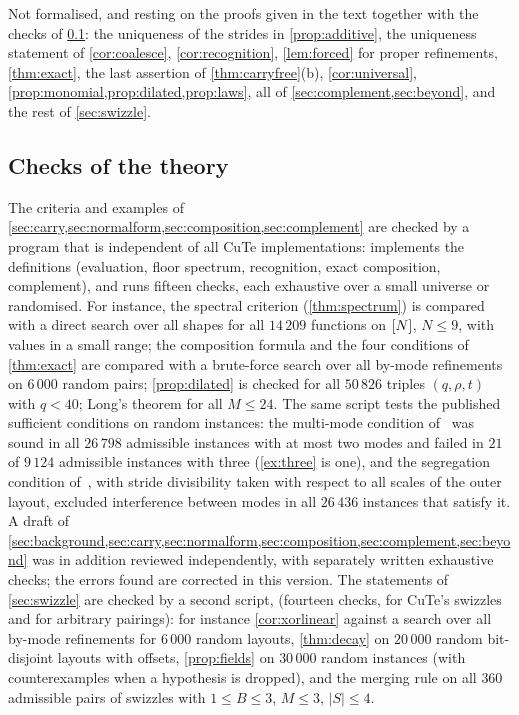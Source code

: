 Not formalised, and resting on the proofs given in the text together with the checks of
\cref{sec:checks}: the uniqueness of the strides in \cref{prop:additive}, the uniqueness statement
of \cref{cor:coalesce},
\cref{cor:recognition}, \cref{lem:forced} for proper refinements, \cref{thm:exact}, the last
assertion of \cref{thm:carryfree}(b), \cref{cor:universal},
\cref{prop:monomial,prop:dilated,prop:laws}, all of \cref{sec:complement,sec:beyond}, and the
rest of \cref{sec:swizzle}.

\subsection{Checks of the theory}\label{sec:checks}

The criteria and examples of \cref{sec:carry,sec:normalform,sec:composition,sec:complement} are
checked by a program that is independent of all CuTe implementations:  implements
the definitions (evaluation, floor spectrum, recognition, exact composition, complement), and
 runs fifteen checks, each exhaustive over a small universe or
randomised. For instance, the spectral criterion (\cref{thm:spectrum}) is compared with a direct
search over all shapes for all $14\,209$ functions on $[N]$, $N\le9$, with values in a small
range; the composition formula and the four conditions of \cref{thm:exact} are compared with a
brute-force search over all by-mode refinements on $6\,000$ random pairs; \cref{prop:dilated} is
checked for all $50\,826$ triples $(q,\rho,t)$ with $q<40$; Long's theorem for all $M\le24$.
The same script tests the published sufficient conditions on random instances: the multi-mode
condition of~\cite{shah2024} was sound in all $26\,798$ admissible instances with at most two
modes and failed in $21$ of $9\,124$ admissible instances with three (\cref{ex:three} is one), and
the segregation condition of~\cite{cecka2026}, with stride divisibility taken with respect to
all scales of the outer layout, excluded interference between modes in all $26\,436$ instances
that satisfy it.
A draft of \cref{sec:background,sec:carry,sec:normalform,sec:composition,sec:complement,sec:beyond}
was in addition reviewed independently, with separately written exhaustive checks; the errors
found are corrected in this version.
The statements of \cref{sec:swizzle} are checked by a second script, 
(fourteen checks, for CuTe's swizzles and for arbitrary pairings): for instance \cref{cor:xorlinear} against a search over all by-mode refinements
for $6\,000$ random layouts, \cref{thm:decay} on $20\,000$ random bit-disjoint layouts with
offsets, \cref{prop:fields} on $30\,000$ random instances (with counterexamples when a hypothesis
is dropped), and the merging rule on all $360$ admissible pairs of swizzles with $1\le B\le3$,
$M\le3$, $|S|\le4$.

